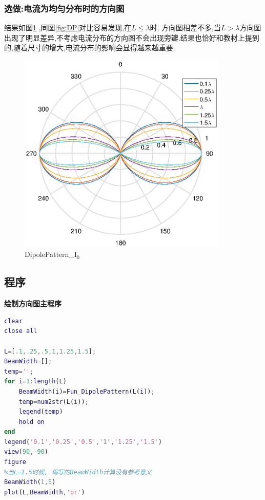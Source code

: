 \subsubsection{选做:电流为均匀分布时的方向图}
结果如图\ref{fig:DP_i0} ,同图\ref{fig:DP}对比容易发现,在$L\le\lambda$时, 方向图相差不多,当$L>\lambda$方向图出现了明显差异,不考虑电流分布的方向图不会出现旁瓣.结果也恰好和教材上提到的,随着尺寸的增大,电流分布的影响会显得越来越重要.
\begin{figure}[!ht]
	\centering
	\includegraphics[width=10cm]{DipolePattern_i0junyun.eps}
	\caption{DipolePattern\_$\mathrm{I_0}$} \label{fig:DP_i0}
\end{figure}







\subsection{程序}
\noindent \textbf{绘制方向图主程序}
\begin{lstlisting}[language={matlab},keywordstyle=\color{blue!70},commentstyle=\color{red!50!green!50!blue!50},frame=shadowbox, rulesepcolor=\color{red!20!green!20!blue!20}] 
clear
close all

L=[.1,.25,.5,1,1.25,1.5];
BeamWidth=[];
temp='';
for i=1:length(L)
    BeamWidth(i)=Fun_DipolePattern(L(i));
    temp=num2str(L(i));
    legend(temp)   
    hold on 
end
legend('0.1','0.25','0.5','1','1.25','1.5')
view(90,-90)
figure
%当L=1.5时候, 编写的BeamWidth计算没有参考意义
BeamWidth(1,5)
plot(L,BeamWidth,'or')

\end{lstlisting}

